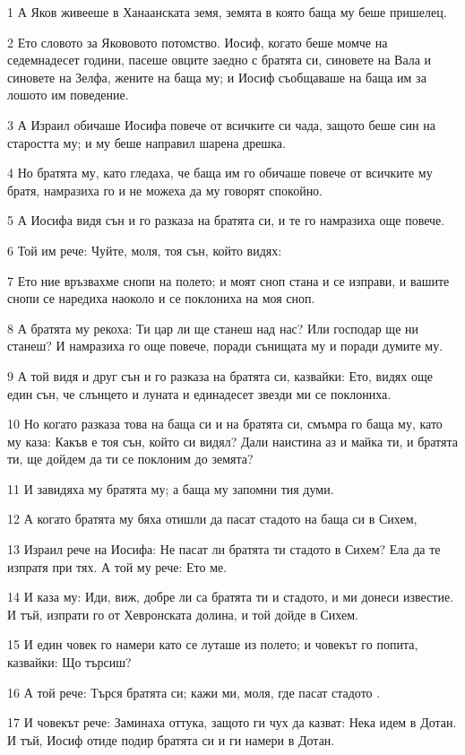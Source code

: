 \par 1 А Яков живееше в Ханаанската земя, земята в която баща му беше пришелец.
\par 2 Ето словото за Якововото потомство. Иосиф, когато беше момче на седемнадесет години, пасеше овците заедно с братята си, синовете на Вала и синовете на Зелфа, жените на баща му; и Иосиф съобщаваше на баща им за лошото им поведение.
\par 3 А Израил обичаше Иосифа повече от всичките си чада, защото беше син на старостта му; и му беше направил шарена дрешка.
\par 4 Но братята му, като гледаха, че баща им го обичаше повече от всичките му братя, намразиха го и не можеха да му говорят спокойно.
\par 5 А Иосифа видя сън и го разказа на братята си, и те го намразиха още повече.
\par 6 Той им рече: Чуйте, моля, тоя сън, който видях:
\par 7 Ето ние връзвахме снопи на полето; и моят сноп стана и се изправи, и вашите снопи се наредиха наоколо и се поклониха на моя сноп.
\par 8 А братята му рекоха: Ти цар ли ще станеш над нас? Или господар ще ни станеш? И намразиха го още повече, поради сънищата му и поради думите му.
\par 9 А той видя и друг сън и го разказа на братята си, казвайки: Ето, видях още един сън, че слънцето и луната и единадесет звезди ми се поклониха.
\par 10 Но когато разказа това на баща си и на братята си, смъмра го баща му, като му каза: Какъв е тоя сън, който си видял? Дали наистина аз и майка ти, и братята ти, ще дойдем да ти се поклоним до земята?
\par 11 И завидяха му братята му; а баща му запомни тия думи.
\par 12 А когато братята му бяха отишли да пасат стадото на баща си в Сихем,
\par 13 Израил рече на Иосифа: Не пасат ли братята ти стадото в Сихем? Ела да те изпратя при тях. А той му рече: Ето ме.
\par 14 И каза му: Иди, виж, добре ли са братята ти и стадото, и ми донеси известие. И тъй, изпрати го от Хевронската долина, и той дойде в Сихем.
\par 15 И един човек го намери като се луташе из полето; и човекът го попита, казвайки: Що търсиш?
\par 16 А той рече: Търся братята си; кажи ми, моля, где пасат стадото .
\par 17 И човекът рече: Заминаха оттука, защото ги чух да казват: Нека идем в Дотан. И тъй, Иосиф отиде подир братята си и ги намери в Дотан.
